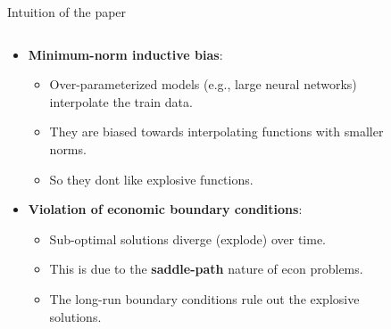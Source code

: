 \documentclass[aspectratio=169,10pt]{beamer}
\newcommand{\emphcolor}[1]{\textbf{\textcolor{emphcolorval}{#1}}}
\begin{document}
\begin{frame}{Intuition of the paper}
	\begin{columns}
		\begin{column}{0.6\textwidth}
			\begin{itemize}
				\item \emphcolor{Minimum-norm inductive bias}: 
				\begin{itemize}
					\item Over-parameterized models (e.g., large neural networks) interpolate the train data.
					\vspace{0.05in}
					\item They are biased towards interpolating functions with smaller norms. 
					\item So they dont like explosive functions.
				\end{itemize}
				\vspace{0.1in}
				\item \emphcolor{Violation of economic boundary conditions}:
				\begin{itemize}
					\item Sub-optimal solutions diverge (explode) over time.
					\vspace{0.05in}
					\item This is due to the \emphcolor{saddle-path} nature of econ problems.
					\vspace{0.05in}
					\item The long-run boundary conditions rule out the explosive solutions.
				\end{itemize}
			\end{itemize}
		\end{column}
		\begin{column}{0.4\textwidth}
		\begin{figure}[t!]

\end{figure}
\end{column}
\end{columns}
\end{frame}
\end{document}
